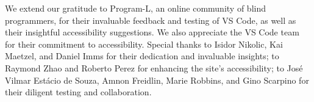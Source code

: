 \documentclass[sigconf]{acmart}
\begin{document}
\begin{acks}
We extend our gratitude to Program-L, an online community of blind
programmers, for their invaluable feedback and testing of VS Code, as
well as their insightful accessibility suggestions. We also appreciate
the VS Code team for their commitment to accessibility. Special thanks
to Isidor Nikolic, Kai Maetzel, and Daniel Imms for their dedication and
invaluable insights; to Raymond Zhao and Roberto Perez for enhancing the
site's accessibility; to José Vilmar Estácio de Souza, Amnon Freidlin,
Marie Robbins, and Gino Scarpino for their diligent testing and
collaboration.
\end{acks}




\end{document}
